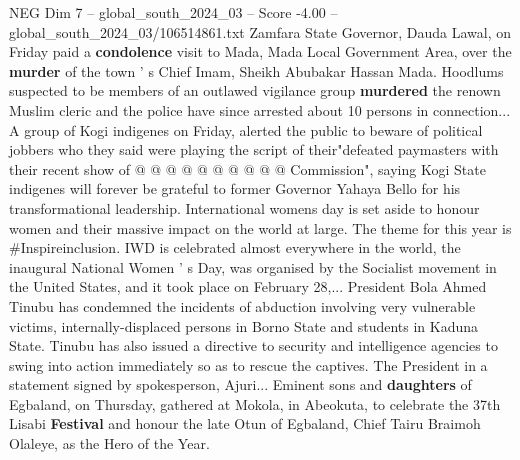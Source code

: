 \begin{textsample}{NEG Dim 7 – global\_south\_2024\_03 – Score -4.00 – global\_south\_2024\_03/106514861.txt}
Zamfara State Governor, Dauda Lawal, on Friday paid a \textbf{condolence} visit to Mada, Mada Local Government Area, over the \textbf{murder} of the town ' s Chief Imam, Sheikh Abubakar Hassan Mada.
Hoodlums suspected to be members of an outlawed vigilance group \textbf{murdered} the renown Muslim cleric and the police have since arrested about 10 persons in connection...
A group of Kogi indigenes on Friday, alerted the public to beware of political jobbers who they said were playing the script of their"defeated paymasters with their recent show of @ @ @ @ @ @ @ @ @ @ Commission", saying Kogi State indigenes will forever be grateful to former Governor Yahaya Bello for his transformational leadership.
International womens day is set aside to honour women and their massive impact on the world at large.
The theme for this year is \#Inspireinclusion.
IWD is celebrated almost everywhere in the world, the inaugural National Women ' s Day, was organised by the Socialist movement in the United States, and it took place on February 28,...
President Bola Ahmed Tinubu has condemned the incidents of abduction involving very vulnerable victims, internally-displaced persons in Borno State and students in Kaduna State.
Tinubu has also issued a directive to security and intelligence agencies to swing into action immediately so as to rescue the captives.
The President in a statement signed by spokesperson, Ajuri...
Eminent sons and \textbf{daughters} of Egbaland, on Thursday, gathered at Mokola, in Abeokuta, to celebrate the 37th Lisabi \textbf{Festival} and honour the late Otun of Egbaland, Chief Tairu Braimoh Olaleye, as the Hero of the Year.

\end{textsample}
